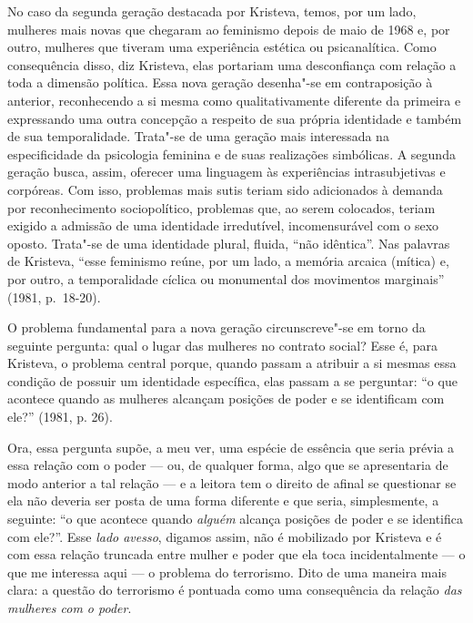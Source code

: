 No caso da segunda geração destacada por Kristeva, temos, por um lado,
mulheres mais novas que chegaram ao feminismo depois de maio de 1968 e,
por outro, mulheres que tiveram uma experiência estética ou
psicanalítica. Como consequência disso, diz Kristeva, elas portariam uma
desconfiança com relação a toda a dimensão política. Essa nova geração
desenha"-se em contraposição à anterior, reconhecendo a si mesma como
qualitativamente diferente da primeira e expressando uma outra concepção
a respeito de sua própria identidade e também de sua temporalidade.
Trata"-se de uma geração mais interessada na especificidade da psicologia
feminina e de suas realizações simbólicas. A segunda geração busca,
assim, oferecer uma linguagem às experiências intrasubjetivas e
corpóreas. Com isso, problemas mais sutis teriam sido adicionados à
demanda por reconhecimento sociopolítico, problemas que, ao serem
colocados, teriam exigido a admissão de uma identidade irredutível,
incomensurável com o sexo oposto. Trata"-se de uma identidade plural,
fluida, ``não idêntica''. Nas palavras de Kristeva, ``esse
feminismo reúne, por um lado, a memória arcaica (mítica) e, por outro, a
temporalidade cíclica ou monumental dos movimentos marginais''
(1981, p.~18-20).

O problema fundamental para a nova geração circunscreve"-se em torno da
seguinte pergunta: qual o lugar das mulheres no contrato social? Esse é,
para Kristeva, o problema central porque, quando passam a atribuir a si
mesmas essa condição de possuir um identidade específica, elas passam a
se perguntar: ``o que acontece quando as mulheres alcançam
posições de poder e se identificam com ele?'' (1981, p. 26).

Ora, essa pergunta supõe, a meu ver, uma espécie de essência que seria
prévia a essa relação com o poder --- ou, de qualquer forma, algo que se
apresentaria de modo anterior a tal relação --- e a leitora tem o direito
de afinal se questionar se ela não deveria ser posta de uma forma
diferente e que seria, simplesmente, a seguinte: ``o que acontece quando
\emph{alguém} alcança posições de poder e se identifica com ele?''. Esse
\emph{lado avesso}, digamos assim, não é mobilizado por Kristeva e é com
essa relação truncada entre mulher e poder que ela toca incidentalmente
--- o que me interessa aqui --- o problema do terrorismo. Dito de uma
maneira mais clara: a questão do terrorismo é pontuada como uma
consequência da relação \emph{das mulheres com o poder}.

